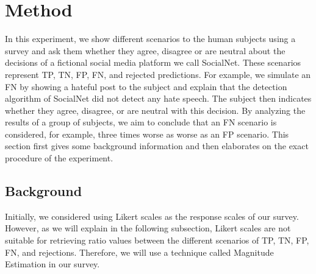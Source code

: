 \documentclass[a4paper]{article}
\begin{document}
\section{Method}
\label{sec:method}
In this experiment, we show different scenarios to the human subjects using a survey and ask them whether they agree, disagree or are neutral about the decisions of a fictional social media platform we call SocialNet. These scenarios represent TP, TN, FP, FN, and rejected predictions. For example, we simulate an FN by showing a hateful post to the subject and explain that the detection algorithm of SocialNet did not detect any hate speech. The subject then indicates whether they agree, disagree, or are neutral with this decision. By analyzing the results of a group of subjects, we aim to conclude that an FN scenario is considered, for example, three times worse as worse as an FP scenario. This section first gives some background information and then elaborates on the exact procedure of the experiment.

\subsection{Background}
Initially, we considered using Likert scales as the response scales of our survey. However, as we will explain in the following subsection, Likert scales are not suitable for retrieving ratio values between the different scenarios of TP, TN, FP, FN, and rejections. Therefore, we will use a technique called Magnitude Estimation in our survey.
\end{document}
